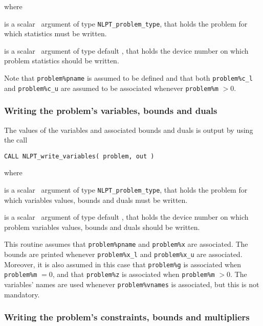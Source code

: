 \documentclass{galahad}
\newcommand{\packagename}{NLPT}
\begin{document}
\noindent where
\begin{description}
 is a scalar \intentin\ argument of type {\tt NLPT\_problem\_type},
that holds the problem for which statistics must be written.

 is a scalar \intentin\ argument of type default \integer, that
holds the device number on which problem statistics should be written.
\end{description}

\noindent
Note that {\tt problem\%pname} is assumed to be defined and that both
{\tt problem\%c\_l} and {\tt problem\%c\_u} are assumed to be associated
whenever {\tt problem\%m} $> 0$.

\subsubsection{Writing the problem's variables, bounds and duals}
\label{w_vars}


The values of the variables and associated bounds and duals is output
by using the call
\vspace*{1mm}

\hspace{8mm}
{\tt CALL \packagename\_write\_variables( problem, out )}

\noindent where
\begin{description}
 is a scalar \intentin\ argument of type {\tt NLPT\_problem\_type},
that holds the problem for which variables values, bounds and duals must be
written.

 is a scalar \intentin\ argument of type default \integer, that
holds the device number on which problem variables values, bounds and duals
should be written.
\end{description}

\noindent
This routine assumes that {\tt problem\%pname} and {\tt problem\%x} are
associated. The bounds are printed whenever {\tt problem\%x\_l} and 
{\tt problem\%x\_u} are associated. Moreover, it is also
assumed in this case that {\tt problem\%g} is associated when {\tt problem\%m}
$= 0$, and that {\tt problem\%z}  is associated when {\tt problem\%m} $> 0$. 
The variables' names are used whenever {\tt problem\%vnames} is associated, but
this is not mandatory.

\subsubsection{Writing the problem's constraints, bounds and multipliers}
\label{w_cons}
\end{document}
